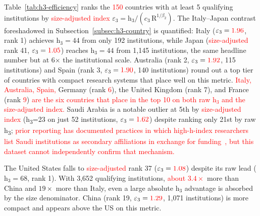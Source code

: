 Table~\ref{tab:h3-efficiency} ranks the \textcolor{red}{150} countries with at least 5 qualifying institutions by \textcolor{red}{size-adjusted index} $\varepsilon_3 = \mathrm{h}_3 / (c_3\,\mathrm{R}^{1/\beta_2})$. The Italy--Japan contrast foreshadowed in Subsection~\ref{subsec:h3-country} is quantified: Italy ($\varepsilon_3 = \textcolor{red}{1.96}$, rank 1) achieves $\mathrm{h}_3 = 44$ from only 192 institutions, while Japan (\textcolor{red}{size-adjusted} rank 41, $\varepsilon_3 = \textcolor{red}{1.05}$) reaches $\mathrm{h}_3 = 44$ from 1,145 institutions, the same headline number but at 6$\times$ the institutional scale. Australia (rank 2, $\varepsilon_3 = \textcolor{red}{1.92}$, 115 institutions) and Spain (rank 3, $\varepsilon_3 = \textcolor{red}{1.90}$, 140 institutions) round out a top tier of countries with compact research systems that place well on this metric. \textcolor{red}{Italy, Australia, Spain,} Germany (rank \textcolor{red}{6}), the United Kingdom (rank 7), and France (rank \textcolor{red}{9}) \textcolor{red}{are the six countries that place in the top 10 on both raw $\mathrm{h}_3$ and the size-adjusted index.} Saudi Arabia is a notable outlier at 5th by \textcolor{red}{size-adjusted index} (h\textsubscript{3}=23 on just 52 institutions, $\varepsilon_3 = \textcolor{red}{1.62}$) despite ranking only 21st by raw h\textsubscript{3}; \textcolor{red}{prior reporting has documented practices in which high-h-index researchers list Saudi institutions as secondary affiliations in exchange for funding~\citep{saudi}, but this dataset cannot independently confirm that mechanism.}

The United States falls to \textcolor{red}{size-adjusted} rank 37 ($\varepsilon_3 = \textcolor{red}{1.08}$) despite its raw lead ($\mathrm{h}_3 = 68$, rank 1). With 3,652 qualifying institutions, \textcolor{red}{about $3.4{\times}$} more than China and $19{\times}$ more than Italy, even a large absolute $\mathrm{h}_3$ advantage is absorbed by the size denominator. China (rank 19, $\varepsilon_3 = \textcolor{red}{1.29}$, 1,071 institutions) is more compact and appears above the US on this metric.%

